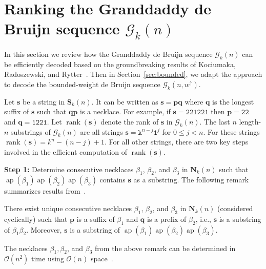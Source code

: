 \documentclass[US-letter,USenglish,authorcolumns,autoref]{lipics-v2021}
\renewcommand{\tt} {\mathtt}
\newcommand{\bS}{\mathbf{S}}
\newcommand{\bN}{\mathbf{N}}
\newcommand{\bp}{\mathbf{p}}
\newcommand{\bs}{\mathbf{s}}
\newcommand{\bq}{\mathbf{q}}
\DeclareMathOperator{\ap}{ap}
\DeclareMathOperator{\rank}{rank}
\begin{document}
\section{Ranking the Granddaddy de Bruijn sequence $\mathcal{G}_k(n)$} \label{sec:granddaddy}

In this section we review how the Granddaddy de Bruijn sequence $\mathcal{G}_k(n)$ can be efficiently decoded based on the groundbreaking results of Kociumaka,  Radoszewski, and  Rytter~\cite{kociumaka}.  Then in Section~\ref{sec:bounded}, we adapt the approach to decode the bounded-weight de Bruijn sequence $\mathcal{G}_k(n,w^\uparrow)$.

%

Let $\bs$ be a string in $\bS_k(n)$. It can be written as $\bs = \bp\bq$ where $\bq$ is the longest suffix of $\bs$ such that $\bq\bp$ is a necklace.  For example, if $\bs = \tt{221221}$
then $\bp = \tt{22}$ and $\bq = \tt{1221}$.
Let $\rank(\bs)$ denote the rank of $\bs$ in $\mathcal{G}_k(n)$. 
%
The last $n$ length-$n$ substrings of $\mathcal{G}_k(n)$ are all strings $\bs = \tt{k}^{n-j}\tt{1}^j$ for $0  \leq  j < n$. For these strings $\rank(\bs) = k^n - (n-j)+1$. 
%
For all other strings, there are two key steps involved in the efficient computation of $\rank(\bs)$. 

\medskip 
\noindent
{\bf Step 1:} Determine consecutive necklaces $\beta_1$, $\beta_2$, and $\beta_3$ in $\bN_k(n)$ such that $\ap(\beta_1)\ap(\beta_2)\ap(\beta_3)$ contains $\bs$ as a substring. 
%
The following remark summarizes results from~\cite{fredricksen-beads-colors}.

%
\begin{remark} \label{rem:granddaddy}
     There exist unique consecutive necklaces $\beta_1$, $\beta_2$, and $\beta_3$ in $\bN_k(n)$ (considered cyclically) such that 
    $\bp$ is a suffix of $\beta_1$ and $\bq$ is a prefix of $\beta_2$, i.e., $\bs$ is a substring of $\beta_1\beta_2$.  Moreover, $\bs$ is a substring of $\ap(\beta_1)\ap(\beta_2)\ap(\beta_3)$.
\end{remark}
%  
The necklaces $\beta_1,\beta_2$, and $\beta_3$ from the above remark can be determined in $\mathcal{O}(n^2)$ time using $\mathcal{O}(n)$ space~\cite{kociumaka}.
\end{document}
